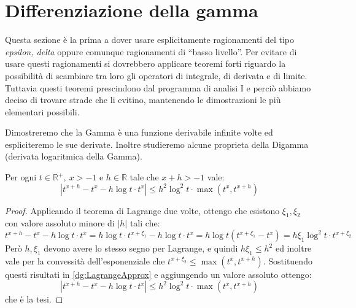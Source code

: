 \section{Differenziazione della gamma}\label{dg}
Questa sezione è la prima a dover usare esplicitamente ragionamenti del tipo \emph{epsilon, delta} oppure comunque ragionamenti di ``basso livello''.
Per evitare di usare questi ragionamenti si dovrebbero applicare teoremi forti riguardo la possibilità
di scambiare tra loro gli operatori di integrale, di derivata e di limite.
Tuttavia questi teoremi prescindono dal programma di analisi I e perciò abbiamo deciso di trovare strade
che li evitino, mantenendo le dimostrazioni le più elementari possibili.

Dimostreremo che la Gamma è una funzione derivabile infinite volte ed espliciteremo le sue derivate.
Inoltre studieremo alcune proprieta della Digamma (derivata logaritmica della Gamma).

\begin{lemma}\label{dg:SenzaIntegrale}
	Per ogni $t\in \mathbb{R}^+,\ x> -1$ e $h\in\mathbb{R}$ tale che $x+h>-1$ vale:
	\begin{equation*}
		|t^{x+h}-t^x-h\log t\cdot t^x| \le h^2\log^2t\cdot\max\left(t^x,t^{x+h}\right)
	\end{equation*}
\end{lemma}
\begin{proof}
	Applicando il teorema di Lagrange due volte, ottengo che esistono $\xi_1,\xi_2$ con valore assoluto minore di $|h|$ tali che:
	\begin{equation}\label{dg:LagrangeApprox}
		t^{x+h}-t^x-h\log t\cdot t^x=h\log t\cdot t^{x+\xi_1}-h\log t\cdot t^x=h\log t\left(t^{x+\xi_1}-t^x\right)=h\xi_1\log^2 t\cdot t^{x+\xi_2}
	\end{equation}
	Però $h,\xi_1$ devono avere lo stesso segno per Lagrange, e quindi $h\xi_1\le h^2$ ed inoltre vale per la convessità dell'esponenziale che $t^{x+\xi_2}\le\max\left(t^x,t^{x+h}\right)$.
	Sostituendo questi risultati in \cref{dg:LagrangeApprox} e aggiungendo un valore assoluto ottengo:
	\begin{equation*}
		|t^{x+h}-t^x-h\log t\cdot t^x|\le h^2\log^2 t\cdot \max\left(t^x,t^{x+h}\right)
	\end{equation*}
	che è la tesi.
\end{proof}

